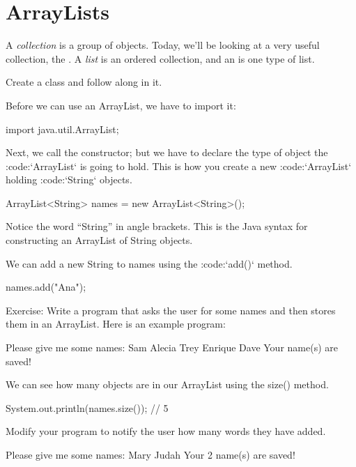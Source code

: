 \chapter{ArrayLists}

A \emph{collection} is a group of objects. Today, we'll be looking at a very useful collection, the . A \emph{list} is an ordered collection, and an  is one type of list.

Create a class  and follow along in it.

Before we can use an ArrayList, we have to import it:

\begin{code}
import java.util.ArrayList;
\end{code}

Next, we call the constructor; but we have to declare the type of object the :code:`ArrayList` is going to hold. This is how you create a new :code:`ArrayList` holding :code:`String` objects.

\begin{code}
ArrayList<String> names = new ArrayList<String>();
\end{code}

Notice the word ``String'' in angle brackets. This is the Java syntax for constructing an ArrayList of String objects.

We can add a new String to names using the :code:`add()` method.

\begin{code}
names.add("Ana");
\end{code}

\begin{example}
Exercise: Write a program that asks the user for some names and then stores them in an ArrayList. Here is an example program:

\begin{monospace}
Please give me some names:
Sam
Alecia
Trey
Enrique
Dave
Your name(s) are saved!
\end{monospace}
\end{example}

We can see how many objects are in our ArrayList using the size() method.

\begin{code}
System.out.println(names.size()); // 5
\end{code}

\begin{example}
Modify your program to notify the user how many words they have added.

\begin{monospace}
Please give me some names:
Mary
Judah
Your 2 name(s) are saved!
\end{monospace}
\end{example}

